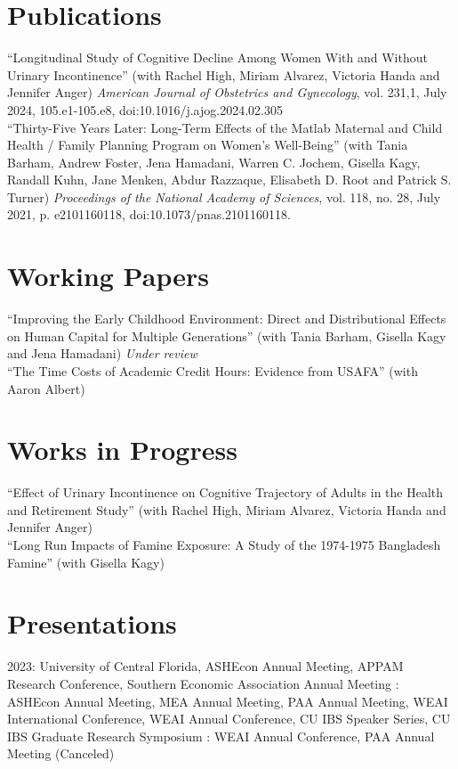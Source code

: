 \documentclass[letterpaper]{article}
\begin{document}
\section*{Publications}
``Longitudinal Study of Cognitive Decline Among Women With and Without Urinary Incontinence'' (with Rachel High, Miriam Alvarez, Victoria Handa and Jennifer Anger)  \textit{American Journal of Obstetrics and Gynecology}, vol. 231,1, July 2024, 105.e1-105.e8, doi:10.1016/j.ajog.2024.02.305
\\[.5em]
``Thirty-Five Years Later: Long-Term Effects of the Matlab Maternal and Child Health / Family Planning Program on Women's Well-Being'' (with Tania Barham, Andrew Foster, Jena Hamadani, Warren C. Jochem, Gisella Kagy, Randall Kuhn, Jane Menken, Abdur Razzaque, Elisabeth D. Root and Patrick S. Turner) \textit{Proceedings of the National Academy of Sciences}, vol. 118, no. 28, July 2021, p. e2101160118, doi:10.1073/pnas.2101160118.


\section*{Working Papers}
``Improving the Early Childhood Environment: Direct and Distributional Effects on Human Capital for Multiple Generations'' (with Tania Barham, Gisella Kagy and Jena Hamadani) \textit{Under review}
\\[.5em]
``The Time Costs of Academic Credit Hours: Evidence from USAFA'' (with Aaron Albert)

\section*{Works in Progress}
``Effect of Urinary Incontinence on Cognitive Trajectory of Adults in the Health and Retirement Study'' (with Rachel High, Miriam Alvarez, Victoria Handa and Jennifer Anger)
\\[.5em]
``Long Run Impacts of Famine Exposure: A Study of the 1974-1975 Bangladesh Famine'' (with Gisella Kagy)

\section*{Presentations}
2023: University of Central Florida, ASHEcon Annual Meeting, APPAM Research Conference, Southern Economic Association Annual Meeting
\newline{}: ASHEcon Annual Meeting, MEA Annual Meeting, PAA Annual Meeting, WEAI International Conference, WEAI Annual Conference, CU IBS Speaker Series, CU IBS Graduate Research Symposium
\newline{}: WEAI Annual Conference, PAA Annual Meeting (Canceled)
\end{document}
